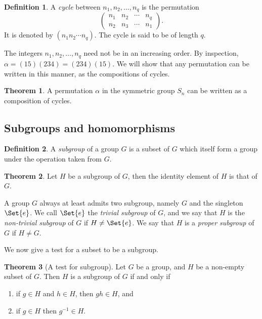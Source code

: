 \documentclass[12pt]{book}
\theoremstyle{definition}
\newtheorem{definition}{Definition}[section]
\newtheorem{theorem}{Theorem}[chapter]
\theoremstyle{remark}
\begin{document}
			 \begin{definition}
			 	A \textit{cycle} between $n_1, n_2, \ldots, n_q$ is the permutation
			 	\begin{equation*}
				 	\begin{pmatrix}
					 	n_1 & n_2 & \cdots & n_q \\
					 	n_2 & n_3 & \cdots & n_1
				 	\end{pmatrix}.
			 	\end{equation*}
			 	It is denoted by $(n_1 n_2 \cdots n_q)$. The cycle is said to be of length $q$.
			 \end{definition}
			 The integers $n_1, n_2, \ldots, n_q$ need not be in an increasing order. By inspection, $\alpha = (1 5)(2 3 4) = (2 3 4)(1 5)$. We will show that any permutation can be written in this manner, as the compositions of cycles.
			 
			 \begin{theorem}
			 	A permutation $\alpha$ in the symmetric group $S_n$ can be written as a composition of cycles.
			 \end{theorem}
	\subsection{Subgroups and homomorphisms}
		\begin{definition}
			A \textit{subgroup} of a group $G$ is a subset of $G$ which itself form a group under the operation taken from $G$.
		\end{definition}
		\begin{theorem}
			Let $H$ be a subgroup of $G$, then the identity element of $H$ is that of $G$.
		\end{theorem}
	
		A group $G$ always at least admits two subgroup, namely $G$ and the singleton $\Set{e}$. We call $\Set{e}$ the \textit{trivial subgroup} of $G$, and we say that $H$ is the \textit{non-trivial subgroup} of $G$ if $H \neq \Set{e}$. We say that $H$ is a \textit{proper subgroup} of $G$ if $H \neq G$.
		
		We now give a test for a subset to be a subgroup.
		
		\begin{theorem}[A test for subgroup]
			Let $G$ be a group, and $H$ be a non-empty subset of $G$. Then $H$ is a subgroup of $G$ if and only if
			\begin{enumerate}
				\item if $g \in H$ and $h \in H$, then $gh \in H$, and
				\item if $g \in H$ then $g^{-1} \in H$.
			\end{enumerate}
		\end{theorem}
		
\end{document}
